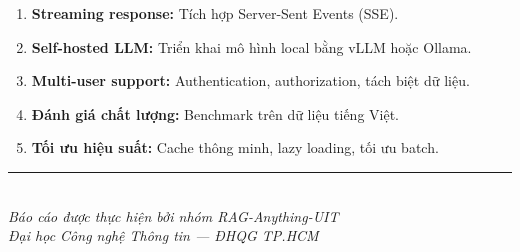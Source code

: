 \documentclass[12pt,a4paper]{article}
\begin{document}
\begin{enumerate}
  \item \textbf{Streaming response:} Tích hợp Server-Sent Events (SSE).
  \item \textbf{Self-hosted LLM:} Triển khai mô hình local bằng vLLM hoặc Ollama.
  \item \textbf{Multi-user support:} Authentication, authorization, tách biệt dữ liệu.
  \item \textbf{Đánh giá chất lượng:} Benchmark trên dữ liệu tiếng Việt.
  \item \textbf{Tối ưu hiệu suất:} Cache thông minh, lazy loading, tối ưu batch.
\end{enumerate}

\vspace{2cm}
\begin{center}
\rule{8cm}{0.4pt}\\[0.5cm]
\textit{Báo cáo được thực hiện bởi nhóm RAG-Anything-UIT}\\
\textit{Đại học Công nghệ Thông tin --- ĐHQG TP.HCM}
\end{center}
\end{document}
